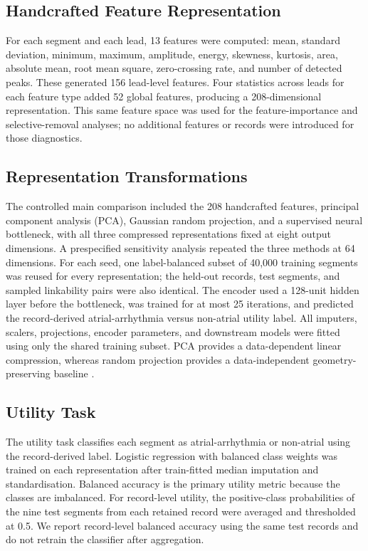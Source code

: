 \documentclass[journal]{IEEEtran}
\begin{document}
\subsection{Handcrafted Feature Representation}
\label{subsec:features}

For each segment and each lead, 13 features were computed: mean, standard
deviation, minimum, maximum, amplitude, energy, skewness, kurtosis, area,
absolute mean, root mean square, zero-crossing rate, and number of detected
peaks. These generated 156 lead-level features. Four statistics across leads
for each feature type added 52 global features, producing a 208-dimensional
representation. This same feature space was used for the feature-importance
and selective-removal analyses; no additional features or records were
introduced for those diagnostics.

\subsection{Representation Transformations}
\label{subsec:representations}

The controlled main comparison included the 208 handcrafted features,
principal component analysis (PCA), Gaussian random projection, and a
supervised neural bottleneck, with all three compressed representations fixed
at eight output dimensions. A prespecified sensitivity analysis repeated the
three methods at 64 dimensions. For each seed, one label-balanced subset of 40,000
training segments was reused for every representation; the held-out records,
test segments, and sampled linkability pairs were also identical. The encoder
used a 128-unit hidden layer before the bottleneck, was trained for at most 25
iterations, and predicted the record-derived atrial-arrhythmia versus
non-atrial utility label. All imputers, scalers, projections, encoder
parameters, and downstream models were fitted using only the shared training
subset. PCA provides a data-dependent linear compression, whereas random
projection provides a data-independent geometry-preserving baseline
\cite{Jolliffe2002PCA,BinghamMannila2001RandomProjection,Achlioptas2003RandomProjections}.

\subsection{Utility Task}
\label{subsec:utility}

The utility task classifies each segment as atrial-arrhythmia or non-atrial
using the record-derived label. Logistic regression with balanced class weights was
trained on each representation after train-fitted median imputation and
standardisation. Balanced accuracy is the primary utility metric because the
classes are imbalanced.
For record-level utility, the positive-class probabilities of the nine test
segments from each retained record were averaged and thresholded at 0.5. We
report record-level balanced accuracy using the same test records and do not
retrain the classifier after aggregation.
\end{document}
